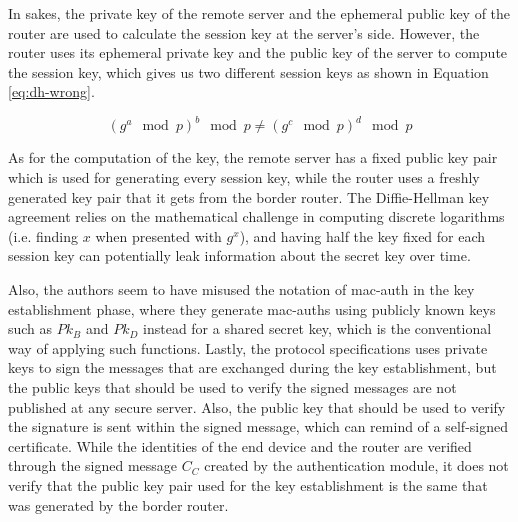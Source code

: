 In \gls{sakes}, the private key of the remote server and the ephemeral public key of the router are used to calculate the session key at the server's side. However, the router uses its ephemeral private key and the public key of the server to compute the session key, which gives us two different session keys as shown in Equation \ref{eq:dh-wrong}.

\begin{equation}
\label{eq:dh-wrong}
(g^a \mod p)^b \mod p \neq (g^c \mod p)^d \mod p
\end{equation}

As for the computation of the key, the remote server has a fixed public key pair which is used for generating every session key, while the router uses a freshly generated key pair that it gets from the border router. The Diffie-Hellman key agreement relies on the mathematical challenge in computing discrete logarithms (i.e. finding $x$ when presented with $g^x$), and having half the key fixed for each session key can potentially leak information about the secret key over time.

Also, the authors seem to have misused the notation of \gls{mac-auth} in the key establishment phase, where they generate \gls{mac-auth}s using publicly known keys such as $Pk_B$ and $Pk_D$ instead for a shared secret key, which is the conventional way of applying such functions. Lastly, the protocol specifications uses private keys to sign the messages that are exchanged during the key establishment, but the public keys that should be used to verify the signed messages are not published at any secure server. Also, the public key that should be used to verify the signature is sent within the signed message, which can remind of a self-signed certificate. While the identities of the end device and the router are verified through the signed message $C_C$ created by the authentication module, it does not verify that the public key pair used for the key establishment is the same that was generated by the border router.

